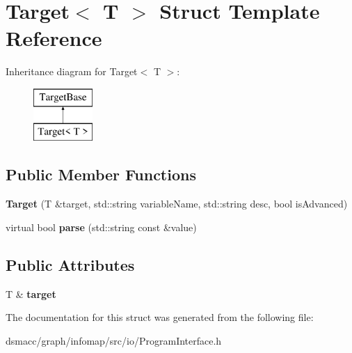 \hypertarget{structTarget}{}\section{Target$<$ T $>$ Struct Template Reference}
\label{structTarget}
Inheritance diagram for Target$<$ T $>$\+:\begin{figure}[H]
\begin{center}
\leavevmode
\includegraphics[height=2.000000cm]{structTarget}
\end{center}
\end{figure}
\subsection*{Public Member Functions}
\begin{DoxyCompactItemize}
\item 
\mbox{\label{structTarget_a981906c9d85f5f38530702611fd0b12d}} 
{\bfseries Target} (T \&target, std\+::string variable\+Name, std\+::string desc, bool is\+Advanced)
\item 
\mbox{\label{structTarget_afa62d2b182db9f45e5f7dd76e098e01f}} 
virtual bool {\bfseries parse} (std\+::string const \&value)
\end{DoxyCompactItemize}
\subsection*{Public Attributes}
\begin{DoxyCompactItemize}
\item 
\mbox{\label{structTarget_afb56843369d21c5de5d8207895f390b1}} 
T \& {\bfseries target}
\end{DoxyCompactItemize}


The documentation for this struct was generated from the following file\+:\begin{DoxyCompactItemize}
\item 
dsmacc/graph/infomap/src/io/Program\+Interface.\+h\end{DoxyCompactItemize}
